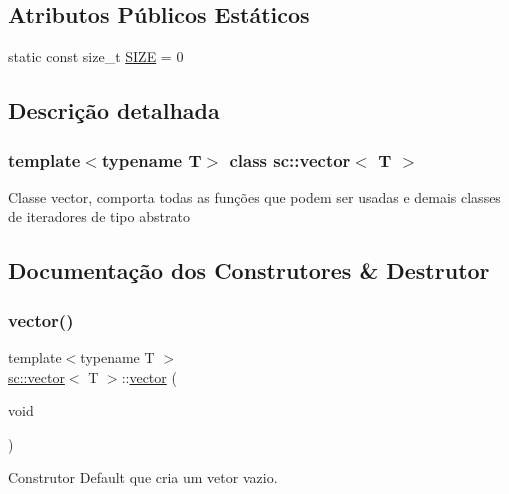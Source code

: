 \subsection*{Atributos Públicos Estáticos}
\begin{DoxyCompactItemize}
\item 
static const size\+\_\+t \mbox{\hyperlink{classsc_1_1vector_a3fadfe198ea4c912fb9ce406ef366a6a}{S\+I\+ZE}} = 0
\end{DoxyCompactItemize}


\subsection{Descrição detalhada}
\subsubsection*{template$<$typename T$>$\newline
class sc\+::vector$<$ T $>$}

Classe vector, comporta todas as funções que podem ser usadas e demais classes de iteradores de tipo abstrato 

\subsection{Documentação dos Construtores \& Destrutor}
\mbox{\label{classsc_1_1vector_a8bdd977a270969ddd857da2bb43bd3ca}} 
\subsubsection{\texorpdfstring{vector()}{vector()}\hspace{0.1cm}{\footnotesize\ttfamily [1/11]}}
{\footnotesize\ttfamily template$<$typename T $>$ \\
\mbox{\hyperlink{classsc_1_1vector}{sc\+::vector}}$<$ T $>$\+::\mbox{\hyperlink{classsc_1_1vector}{vector}} (\begin{DoxyParamCaption}\item[{void}]{ }\end{DoxyParamCaption})}

Construtor Default que cria um vetor vazio. \mbox{\label{classsc_1_1vector_a641fcc38459aee8e3bdf86abb5f9d193}} 
